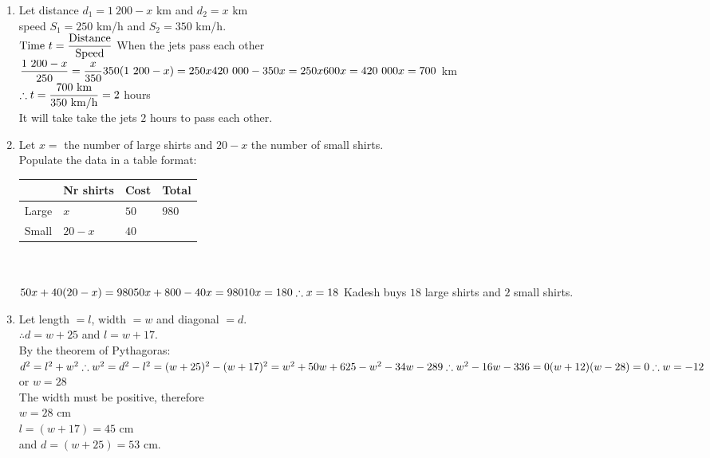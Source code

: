  \begin{solutions}{}{
\begin{enumerate}[itemsep=10pt, label=\textbf{\arabic*}. ] 


\item Let distance $d_1=1~200-x$ km and $d_2=x$ km \\
speed $S_1=250$ km/h and $S_2=350$ km/h. \\
$\mbox{Time } t = \dfrac{\mbox{Distance}}{\mbox{Speed}} \\[5pt]$
When the jets pass each other $\dfrac{1~200-x}{250} = \dfrac{x}{350}\\[5pt]
350(1~200-x)=250x\\
420~000 - 350x = 250x\\
600x = 420~000\\
x= 700$ km\\[5pt]

$\therefore t=\dfrac{700\mbox{ km}}{350{\mbox{ km/h}}}\\[5pt]
=2$ hours\\
It will take take the jets $2$ hours to pass each other.

\item  Let $x=$ the number of large shirts and $20-x$ the number of small shirts.\\
Populate the data in a table format:\\
  \begin{tabularx}{8cm}{ |X|X|X|X| }\hline
& Nr shirts & Cost & Total \\ \hline
Large & $x$ & $50$ & $980$\\ \hline
Small & $20-x$ & $40$&\\ \hline
\end{tabularx}\\
\\
$50x+40(20-x)=980\\
50x+800-40x=980\\
10x=180\\
\therefore x=18\\$
Kadesh buys $18$ large shirts and $2$ small shirts.

\item Let length $=l$, width $=w$ and diagonal $=d$.\\
$\therefore d=w+25$ and $l=w+17$.\\
By the theorem of Pythagoras:\\
$d^2 = l^2+w^2\\
\therefore w^2 = d^2-l^2\\
=(w+25)^2 - (w+17)^2\\
=w^2+50w+625-w^2-34w-289\\
\therefore w^2 - 16w - 336 = 0\\
(w+12)(w-28)=0\\
\therefore w= -12$ or $w=28$\\
The width must be positive, therefore \\
$w=28$ cm\\ 
$l=(w+17)=45$ cm \\
and $d=(w+25)=53$ cm.



\end{enumerate}}
\end{solutions}
